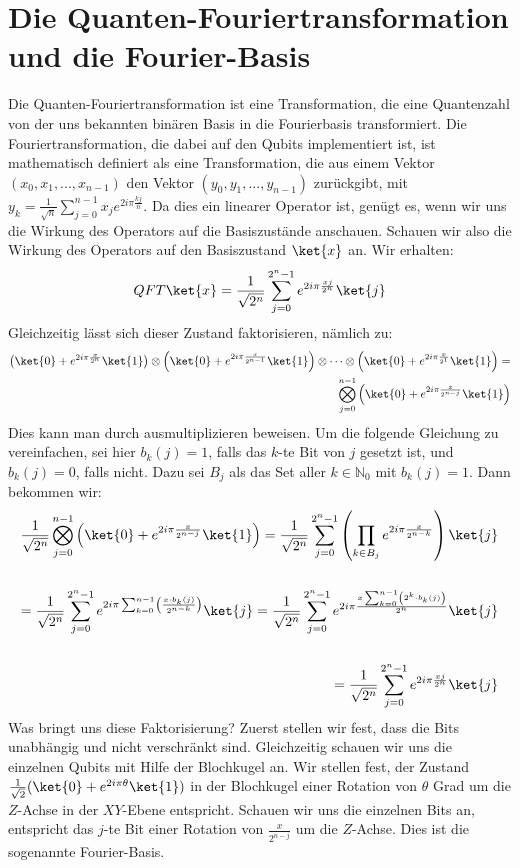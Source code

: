\section{Die Quanten-Fouriertransformation und die Fourier-Basis}
Die Quanten-Fouriertransformation ist eine Transformation, die eine Quantenzahl von der uns bekannten binären Basis in die Fourierbasis transformiert. Die Fouriertransformation, die dabei auf den Qubits implementiert ist, ist mathematisch definiert als eine Transformation, die aus einem Vektor $(x_0, x_1, ..., x_{n - 1})$ den Vektor $(y_0, y_1, ..., y_{n - 1})$ zurückgibt, mit $y_k = \frac{1}{\sqrt{n}}\sum_{j = 0}^{n - 1}x_je^{2i\pi\frac{kj}{n}}$. Da dies ein linearer Operator ist, genügt es, wenn wir uns die Wirkung des Operators auf die Basiszustände anschauen. Schauen wir also die Wirkung des Operators auf den Basiszustand $\ket{x}$ an. Wir erhalten:
$$QFT\ket{x} = \frac{1}{\sqrt{2^n}}\sum^{2^n - 1}_{j = 0}e^{2i\pi\frac{xj}{2^n}}\ket{j}$$
Gleichzeitig lässt sich dieser Zustand faktorisieren, nämlich zu:
\begin{align*}
\left(\ket{0} + e^{2i\pi\frac{x}{2^{n}}}\ket{1}\right)\otimes\left(\ket{0} + e^{2i\pi\frac{x}{2^{n - 1}}}\ket{1}\right)\otimes\cdots\otimes\left(\ket{0} + e^{2i\pi\frac{x}{2^{1}}}\ket{1}\right) = \\ \bigotimes_{j = 0}^{n - 1}\left(\ket{0} + e^{2i\pi\frac{x}{2^{n - j}}}\ket{1}\right)
\end{align*}
Dies kann man durch ausmultiplizieren beweisen. Um die folgende Gleichung zu vereinfachen, sei hier $b_k(j) = 1$, falls das $k$-te Bit von $j$ gesetzt ist, und $b_k(j) = 0$, falls nicht. Dazu sei $B_j$ als das Set aller $k \in \mathbb{N}_0$ mit $b_k(j) = 1$. Dann bekommen wir:
\begin{align*}
\frac{1}{\sqrt{2^n}}\bigotimes_{j = 0}^{n - 1}\left(\ket{0} + e^{2i\pi\frac{x}{2^{n - j}}}\ket{1}\right) = \frac{1}{\sqrt{2^n}}\sum_{j = 0}^{2^n - 1}\left(\prod_{k \in B_j}e^{2i\pi\frac{x}{2^{n - k}}}\right)\ket{j} \\ \\
= \frac{1}{\sqrt{2^n}}\sum_{j = 0}^{2^n - 1}e^{2i\pi\sum_{k = 0}^{n - 1}\left(\frac{x \cdot b_k(j)}{2^{n - k}}\right)}\ket{j} = \frac{1}{\sqrt{2^n}}\sum_{j = 0}^{2^n - 1}e^{2i\pi\frac{x\sum_{k = 0}^{n - 1}\left(2^k\cdot b_k(j)\right)}{2^n}}\ket{j} \\ \\
= \frac{1}{\sqrt{2^n}}\sum_{j = 0}^{2^n - 1}e^{2i\pi\frac{xj}{2^n}}\ket{j}
\end{align*}
Was bringt uns diese Faktorisierung? Zuerst stellen wir fest, dass die Bits unabhängig und nicht verschränkt sind. Gleichzeitig schauen wir uns die einzelnen Qubits mit Hilfe der Blochkugel an. Wir stellen fest, der Zustand $\frac{1}{\sqrt{2}}(\ket{0} + e^{2i\pi\theta}\ket{1})$ in der Blochkugel einer Rotation von $\theta$ Grad um die $Z$-Achse in der $XY$-Ebene entspricht. Schauen wir uns die einzelnen Bits an, entspricht das $j$-te Bit einer Rotation von $\frac{x}{2^{n - j}}$ um die $Z$-Achse. Dies ist die sogenannte Fourier-Basis.

